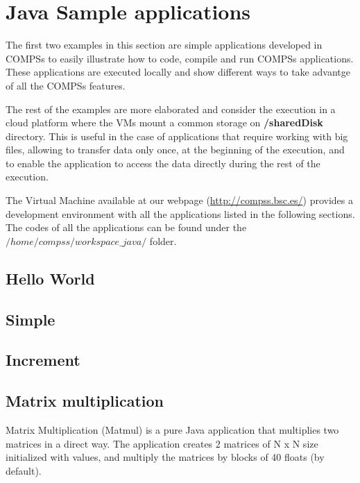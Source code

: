 \section{Java Sample applications}
\label{sec:JavaSampleApps}

The first two examples in this section are simple applications developed in COMPSs to easily illustrate how to code,
compile and run COMPSs applications. These applications are executed locally and show different ways to take advantge
of all the COMPSs features. 

The rest of the examples are more elaborated and consider the execution in a cloud platform where the VMs mount a common 
storage on \textbf{/sharedDisk} directory. This is useful in the case of applications that require working 
with big files, allowing to transfer data only once, at the beginning of the execution, and to enable 
the application to access the data directly during the rest of the execution.

The Virtual Machine available at our webpage (\url{http://compss.bsc.es/}) provides a development environment with
all the applications listed in the following sections. The codes of all the applications can be found under the 
$/home/compss/workspace\_java/$ folder. 

\subsection{Hello World}


\subsection{Simple}


\subsection{Increment}


\subsection{Matrix multiplication}
Matrix Multiplication (Matmul) is a pure Java application that multiplies two matrices in a direct way. 
The application creates 2 matrices of N x N size initialized with values, and multiply the matrices by 
blocks of 40 floats (by default).

